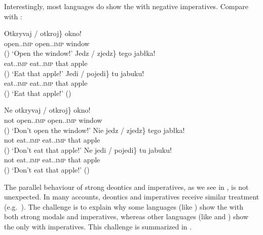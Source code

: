 \documentclass[output=paper,newtxmath,colorlinks,citecolor=brown]{langsci/langscibook}
\begin{document}
\noindent Interestingly, most  languages do show the  with negative imperatives. Compare  with :

\ea \label{crossslavimp} \ea \gll \minsp{\{} Otkryvaj / otkroj\} okno! \\
  	{} open.\textsc{.imp} {} open.\textsc{.imp}  window \\ \hfill ()
 	\glt `Open the window!'
    \ex \gll \minsp{\{} Jedz / zjedz\} tego jabłka! \\
	{} eat.\textsc{.imp} {} eat.\textsc{.imp} that apple\\ \hfill ()
	\glt `Eat that apple!'
    \ex \gll \minsp{\{} Jedi / pojedi\} tu jabuku! \\
	{} eat.\textsc{.imp} {} eat.\textsc{.imp} that apple\\ \hfill ()
	\glt `Eat that apple!' \hfill (\citealt[2]{des16})
    \z \z

   \ea  \label{crossslavimpneg} \ea \gll Ne \minsp{\{} otkryvaj / \minsp{*}  otkroj\} okno! \\
  	not {} open.\textsc{.imp} {} {} open.\textsc{.imp} window \\ \hfill ()
 	\glt `Don't open the window!'
    \ex \gll Nie \minsp{\{} jedz / \minsp{*}  zjedz\} tego jabłka! \\
	not {} eat.\textsc{.imp} {} {} eat.\textsc{.imp} that apple\\ \hfill ()
	\glt `Don't eat that apple!'
    \ex \gll Ne \minsp{\{} jedi / \minsp{*}  pojedi\} tu jabuku! \\
	not {} eat.\textsc{.imp} {} {} eat.\textsc{.imp} that apple\\ \hfill ()
	\glt `Don't eat that apple!' \hfill (\citealt[2]{des16})
    \z \z

\noindent The parallel behaviour of strong deontics and imperatives, as we see in , is not unexpected.  In many accounts, deontics and imperatives receive similar treatment (e.g.\ \citealt{han99,nin05,kau12}). The challenge is to explain why some  languages (like ) show the  with both strong  modals and imperatives, whereas other  languages (like  and ) show the   only with imperatives. This challenge is summarized in .
\end{document}
